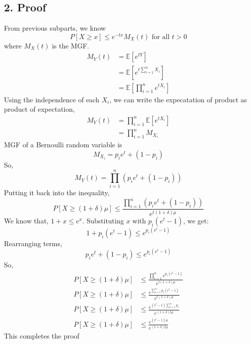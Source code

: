 \begin{solution}
	\subsection*{2. Proof}
	From previous subparts, we know
	\[P[X\geq x]\leq e^{-tx}M_X(t) \text{ for all } t>0\]
	where $M_X(t)$ is the MGF.
	\begin{align}
		M_Y(t) & = \mathds{E}[e^{tY}]                             \\
		       & = \mathds{E}[e^{t\sum_{i=1}^{n}X_i}]             \\
		       & = \mathds{E}\left[\prod_{i=1}^{n}e^{tX_i}\right]
	\end{align}
	Using the independence of each $X_i$, we can write the expecatation of product as product of expectation,
	\begin{align}
		M_Y(t) & = \prod_{i=1}^{n}\mathds{E}[e^{tX_i}] \\
		       & = \prod_{i=1}^{n}M_{X_i}
	\end{align}
	MGF of a Bernoulli random variable is
	\[M_{X_i} = p_ie^t+(1-p_i)\]
	So,
	\[
		M_Y(t) = \prod_{i=1}^{n}(p_ie^t+(1-p_i))
	\]
	Putting it back into the inequality,
	\[P[X\geq (1+\delta)\mu]\leq \frac{\prod_{i=1}^{n}(p_ie^t+(1-p_i))}{e^{t(1+\delta)\mu}}\]
	We know that, $1+x \leq e^x$. Substituting $x$ with $p_i(e^t-1)$, we get:
	\[1+p_i(e^t-1) \leq e^{p_i(e^t-1)}\]
	Rearranging terms,
	\[p_ie^t + (1-p_i) \leq e^{p_i(e^t-1)} \]
	So,
	\begin{align}
		P[X\geq (1+\delta)\mu] & \leq \frac{\prod_{i=1}^{n}e^{p_i(e^t-1)}}{e^{t(1+\delta)\mu}} \\
		P[X\geq (1+\delta)\mu] & \leq \frac{e^{\sum_{i=1}^{n}p_i(e^t-1)}}{e^{t(1+\delta)\mu}}  \\
		P[X\geq (1+\delta)\mu] & \leq \frac{e^{(e^t-1)\sum_{i=1}^{n}p_i}}{e^{(1+\delta)t\mu}}  \\
		P[X\geq (1+\delta)\mu] & \leq \frac{e^{(e^t-1)\mu}}{e^{(1+\delta)t\mu}}
		\label{en:q4dineq}
	\end{align}
	This completes the proof

\end{solution}
